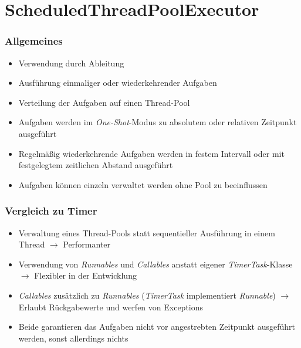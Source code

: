 \section{ScheduledThreadPoolExecutor}
\begin{frame}
   \frametitle{Allgemeines}
   \begin{itemize}
     	\item Verwendung durch Ableitung
     	\item Ausführung einmaliger oder wiederkehrender Aufgaben
     	\item Verteilung der Aufgaben auf einen Thread-Pool
     	\item Aufgaben werden im \emph{One-Shot}-Modus zu absolutem 
     		oder relativen Zeitpunkt ausgeführt
     	\item Regelmäßig wiederkehrende Aufgaben werden in festem Intervall oder 
     		mit festgelegtem zeitlichen Abstand ausgeführt
     	\item Aufgaben können einzeln verwaltet werden ohne Pool zu beeinflussen
   \end{itemize}
\end{frame}

\begin{frame}
   \frametitle{Vergleich zu Timer}
   \begin{itemize}
     	\item Verwaltung eines Thread-Pools statt sequentieller Ausführung in einem 
     		Thread 
     		$\rightarrow$ Performanter
     	\item Verwendung von \emph{Runnables} und \emph{Callables} anstatt 
     		eigener \emph{TimerTask}-Klasse 
     		$\rightarrow$ Flexibler in der Entwicklung
     	\item \emph{Callables} zusätzlich zu \emph{Runnables} (\emph{TimerTask} 
     		implementiert \emph{Runnable}) 
     		$\rightarrow$ Erlaubt Rückgabewerte und werfen von Exceptions
     	\item Beide garantieren das Aufgaben nicht vor angestrebten Zeitpunkt 
     		ausgeführt werden, sonst allerdings nichts
   \end{itemize}
\end{frame}

